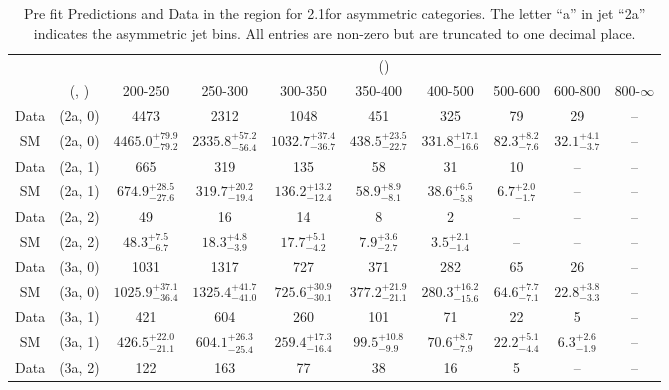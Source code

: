 \begin{table}[h!]
\tiny
\centering
\caption{Pre fit Predictions and Data in the \mj region for 2.1\ifb for asymmetric categories. The letter ``a'' in jet \eg ``2a''  indicates the asymmetric jet bins. All entries are non-zero but are truncated to one decimal place.\label{tab:predallqcdnaive_mu_comb_asym}}
\begin{tabular}
{cccccccccc}
	\hline\hline
	&	& \multicolumn{8}{c}{\scalht (\gev)}\\ 
	&	 (\njet, \nb) & 200-250 & 250-300 & 300-350 & 350-400 & 400-500 & 500-600 & 600-800 & 800-$\infty$ \\ [0.8ex] 
\hline
	Data & (2a, 0) & 4473 & 2312 & 1048 & 451 & 325 & 79 & 29 & -- \\[0.5ex] 
	SM & (2a, 0) & $4465.0^{+ 79.9 }_{- 79.2 }$ & $2335.8^{+ 57.2 }_{- 56.4 }$ & $1032.7^{+ 37.4 }_{- 36.7 }$ & $438.5^{+ 23.5 }_{- 22.7 }$ & $331.8^{+ 17.1 }_{- 16.6 }$ & $82.3^{+ 8.2 }_{- 7.6 }$ & $32.1^{+ 4.1 }_{- 3.7 }$ & -- \\[0.5ex] 
	Data & (2a, 1) & 665 & 319 & 135 & 58 & 31 & 10 & -- & -- \\[0.5ex] 
	SM & (2a, 1) & $674.9^{+ 28.5 }_{- 27.6 }$ & $319.7^{+ 20.2 }_{- 19.4 }$ & $136.2^{+ 13.2 }_{- 12.4 }$ & $58.9^{+ 8.9 }_{- 8.1 }$ & $38.6^{+ 6.5 }_{- 5.8 }$ & $6.7^{+ 2.0 }_{- 1.7 }$ & -- & -- \\[0.5ex] 
	Data & (2a, 2) & 49 & 16 & 14 & 8 & 2 & -- & -- & -- \\[0.5ex] 
	SM & (2a, 2) & $48.3^{+ 7.5 }_{- 6.7 }$ & $18.3^{+ 4.8 }_{- 3.9 }$ & $17.7^{+ 5.1 }_{- 4.2 }$ & $7.9^{+ 3.6 }_{- 2.7 }$ & $3.5^{+ 2.1 }_{- 1.4 }$ & -- & -- & -- \\[0.5ex] 
	Data & (3a, 0) & 1031 & 1317 & 727 & 371 & 282 & 65 & 26 & -- \\[0.5ex] 
	SM & (3a, 0) & $1025.9^{+ 37.1 }_{- 36.4 }$ & $1325.4^{+ 41.7 }_{- 41.0 }$ & $725.6^{+ 30.9 }_{- 30.1 }$ & $377.2^{+ 21.9 }_{- 21.1 }$ & $280.3^{+ 16.2 }_{- 15.6 }$ & $64.6^{+ 7.7 }_{- 7.1 }$ & $22.8^{+ 3.8 }_{- 3.3 }$ & -- \\[0.5ex] 
	Data & (3a, 1) & 421 & 604 & 260 & 101 & 71 & 22 & 5 & -- \\[0.5ex] 
	SM & (3a, 1) & $426.5^{+ 22.0 }_{- 21.1 }$ & $604.1^{+ 26.3 }_{- 25.4 }$ & $259.4^{+ 17.3 }_{- 16.4 }$ & $99.5^{+ 10.8 }_{- 9.9 }$ & $70.6^{+ 8.7 }_{- 7.9 }$ & $22.2^{+ 5.1 }_{- 4.4 }$ & $6.3^{+ 2.6 }_{- 1.9 }$ & -- \\[0.5ex] 
	Data & (3a, 2) & 122 & 163 & 77 & 38 & 16 & 5 & -- & -- \\[0.5ex] 

\end{tabular}
\end{table}
